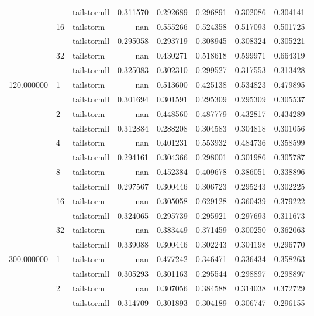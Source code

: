 \begin{tabular}{lllrrrrr}
 &  & tailstormll & 0.311570 & 0.292689 & 0.296891 & 0.302086 & 0.304141 \\
 & \multirow[c]{2}{*}{16} & tailstorm & nan & 0.555266 & 0.524358 & 0.517093 & 0.501725 \\
 &  & tailstormll & 0.295058 & 0.293719 & 0.308945 & 0.308324 & 0.305221 \\
 & \multirow[c]{2}{*}{32} & tailstorm & nan & 0.430271 & 0.518618 & 0.599971 & 0.664319 \\
 &  & tailstormll & 0.325083 & 0.302310 & 0.299527 & 0.317553 & 0.313428 \\
\multirow[c]{12}{*}{120.000000} & \multirow[c]{2}{*}{1} & tailstorm & nan & 0.513600 & 0.425138 & 0.534823 & 0.479895 \\
 &  & tailstormll & 0.301694 & 0.301591 & 0.295309 & 0.295309 & 0.305537 \\
 & \multirow[c]{2}{*}{2} & tailstorm & nan & 0.448560 & 0.487779 & 0.432817 & 0.434289 \\
 &  & tailstormll & 0.312884 & 0.288208 & 0.304583 & 0.304818 & 0.301056 \\
 & \multirow[c]{2}{*}{4} & tailstorm & nan & 0.401231 & 0.553932 & 0.484736 & 0.358599 \\
 &  & tailstormll & 0.294161 & 0.304366 & 0.298001 & 0.301986 & 0.305787 \\
 & \multirow[c]{2}{*}{8} & tailstorm & nan & 0.452384 & 0.409678 & 0.386051 & 0.338896 \\
 &  & tailstormll & 0.297567 & 0.300446 & 0.306723 & 0.295243 & 0.302225 \\
 & \multirow[c]{2}{*}{16} & tailstorm & nan & 0.305058 & 0.629128 & 0.360439 & 0.379222 \\
 &  & tailstormll & 0.324065 & 0.295739 & 0.295921 & 0.297693 & 0.311673 \\
 & \multirow[c]{2}{*}{32} & tailstorm & nan & 0.383449 & 0.371459 & 0.300250 & 0.362063 \\
 &  & tailstormll & 0.339088 & 0.300446 & 0.302243 & 0.304198 & 0.296770 \\
\multirow[c]{12}{*}{300.000000} & \multirow[c]{2}{*}{1} & tailstorm & nan & 0.477242 & 0.346471 & 0.336434 & 0.358263 \\
 &  & tailstormll & 0.305293 & 0.301163 & 0.295544 & 0.298897 & 0.298897 \\
 & \multirow[c]{2}{*}{2} & tailstorm & nan & 0.307056 & 0.384588 & 0.314038 & 0.372729 \\
 &  & tailstormll & 0.314709 & 0.301893 & 0.304189 & 0.306747 & 0.296155 \\

\end{tabular}
